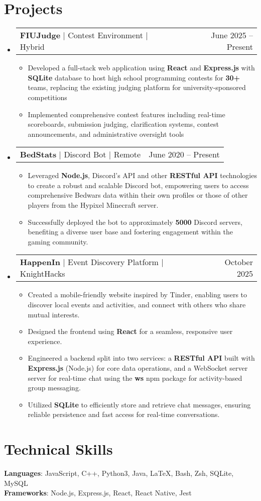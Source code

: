 \documentclass[letterpaper,9pt]{article} %
\makeatletter
\newcommand{\resumeItem}[1]{
  \item\small{
    {#1 \vspace{-2pt}}
  }
}
\newcommand{\resumeProjectHeading}[2]{
    \item
    \begin{tabular*}{0.97\textwidth}{l@{\extracolsep{\fill}}r}
      \small#1 & #2 \\
    \end{tabular*}\vspace{-6pt}
}
\newcommand{\resumeSubHeadingListStart}{\begin{itemize}[leftmargin=0.15in, label={}]}
\newcommand{\resumeSubHeadingListEnd}{\end{itemize}}
\newcommand{\resumeItemListStart}{\begin{itemize}}
\newcommand{\resumeItemListEnd}{\end{itemize}\vspace{-4pt}}
\makeatother
\begin{document}
\section{Projects}
    \resumeSubHeadingListStart
		  \resumeProjectHeading
          {\textbf{FIUJudge} $|$ Contest Environment $|$ Hybrid}{June 2025 -- Present}
          \resumeItemListStart
            \resumeItem{Developed a full-stack web application using \textbf{React} and \textbf{Express.js} with \textbf{SQLite} database to host high school programming contests for \textbf{30+} teams, replacing the existing judging platform for university-sponsored competitions}
            \resumeItem{Implemented comprehensive contest features including real-time scoreboards, submission judging, clarification systems, contest announcements, and administrative oversight tools}
          \resumeItemListEnd
    \resumeSubHeadingListEnd

    \resumeSubHeadingListStart
      \resumeProjectHeading
          {\textbf{BedStats} $|$ Discord Bot $|$ Remote}{June 2020 -- Present}
          \resumeItemListStart
            \resumeItem{Leveraged \textbf{Node.js}, Discord’s API and other \textbf{RESTful API} technologies to create a robust and scalable Discord bot, empowering users to access comprehensive Bedwars data within their own profiles or those of other players from the Hypixel Minecraft server.}
            \resumeItem{Successfully deployed the bot to approximately \textbf{5000} Discord servers, benefiting a diverse user base and fostering engagement within the gaming community.}
          \resumeItemListEnd
      
    \resumeSubHeadingListEnd
    \resumeSubHeadingListStart
      \resumeProjectHeading
          {\textbf{HappenIn} $|$ Event Discovery Platform $|$ KnightHacks}{October 2025}
          \resumeItemListStart
            \resumeItem{Created a mobile-friendly website inspired by Tinder, enabling users to discover local events and activities, and connect with others who share mutual interests.}
            \resumeItem{Designed the frontend using \textbf{React} for a seamless, responsive user experience.}
            \resumeItem{Engineered a backend split into two services: a \textbf{RESTful API} built with \textbf{Express.js} (Node.js) for core data operations, and a WebSocket server server for real-time chat using the \textbf{ws} npm package for activity-based group messaging.}
            \resumeItem{Utilized \textbf{SQLite} to efficiently store and retrieve chat messages, ensuring reliable persistence and fast access for real-time conversations.}
          \resumeItemListEnd
    \resumeSubHeadingListEnd
    
\section{Technical Skills}
\vspace{5pt}
 \begin{itemize}[leftmargin=0.15in, label={}]
    \small{\item{
     \textbf{Languages}{: JavaScript, C++, Python3, Java, \LaTeX, Bash, Zsh, SQLite, MySQL} \\
     \textbf{Frameworks}{: Node.js, Express.js, React, React Native, Jest}
    }}
 \end{itemize}
\end{document}
